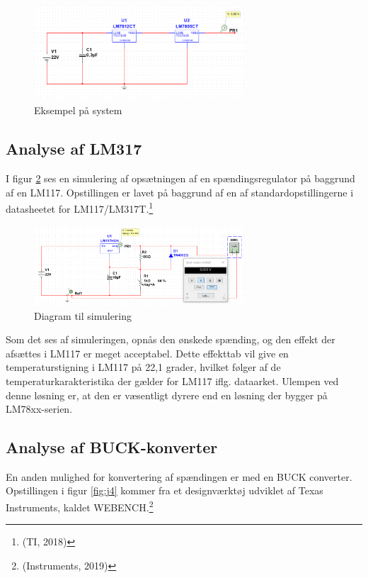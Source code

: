 \begin{figure}[h]
  \centering
  \includegraphics[width=0.7\textwidth]{./figurer/j2.png}
  \caption{Eksempel på system}
  \label{fig:j2}
\end{figure}

\subsection{Analyse af LM317 }
\label{sec:analyse-af-lm317}

I figur \ref{fig:j3} ses en simulering af opsætningen af en spændingsregulator på baggrund af en LM117. Opstillingen er lavet på baggrund af en af standardopstillingerne i datasheetet for LM117/LM317T.\footnote{(TI, 2018)}

\begin{figure}[h]
  \centering
  \includegraphics[width=0.7\textwidth]{./figurer/j3.png}
  \caption{Diagram til simulering}
  \label{fig:j3}
\end{figure}

Som det ses af simuleringen, opnås den ønskede spænding, og den effekt der afsættes i LM117 er meget acceptabel. Dette effekttab vil give en temperaturstigning i LM117 på 22,1 grader, hvilket følger af de temperaturkarakteristika der gælder for LM117 iflg. dataarket. Ulempen ved denne løsning er, at den er væsentligt dyrere end en løsning der bygger på LM78xx-serien.

\subsection{Analyse af BUCK-konverter}
\label{sec:analyse-af-buck}

En anden mulighed for konvertering af spændingen er med en BUCK converter. Opstillingen i figur \ref{fig:j4} kommer fra et designværktøj udviklet af Texas Instruments, kaldet WEBENCH.\footnote{(Instruments, 2019)}

